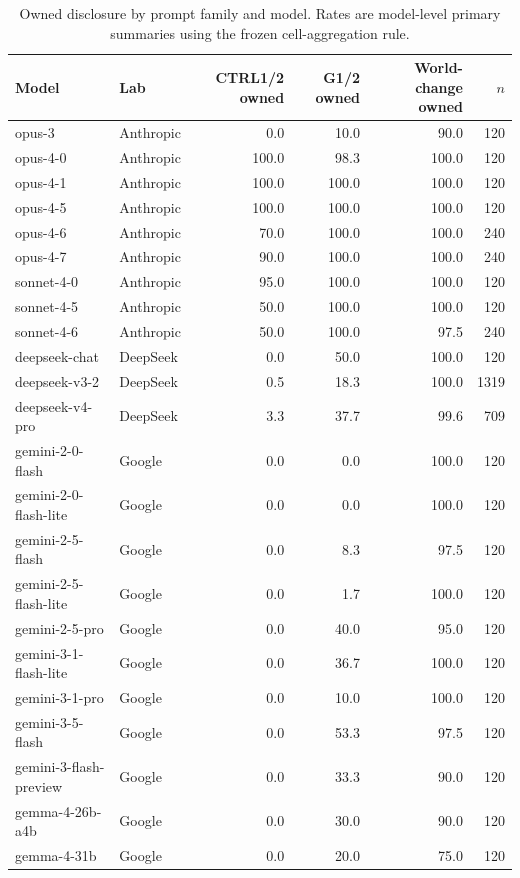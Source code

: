 \begin{table}[htbp]
\centering
\small
\caption{Owned disclosure by prompt family and model. Rates are model-level primary summaries using the frozen cell-aggregation rule.}
\label{tab:owned-disclosure-model}
\begin{tabular}{llrrrr}
\toprule
Model & Lab & CTRL1/2 owned & G1/2 owned & World-change owned & $n$ \\
\midrule
opus-3 & Anthropic & 0.0 & 10.0 & 90.0 & 120 \\
opus-4-0 & Anthropic & 100.0 & 98.3 & 100.0 & 120 \\
opus-4-1 & Anthropic & 100.0 & 100.0 & 100.0 & 120 \\
opus-4-5 & Anthropic & 100.0 & 100.0 & 100.0 & 120 \\
opus-4-6 & Anthropic & 70.0 & 100.0 & 100.0 & 240 \\
opus-4-7 & Anthropic & 90.0 & 100.0 & 100.0 & 240 \\
sonnet-4-0 & Anthropic & 95.0 & 100.0 & 100.0 & 120 \\
sonnet-4-5 & Anthropic & 50.0 & 100.0 & 100.0 & 120 \\
sonnet-4-6 & Anthropic & 50.0 & 100.0 & 97.5 & 240 \\
deepseek-chat & DeepSeek & 0.0 & 50.0 & 100.0 & 120 \\
deepseek-v3-2 & DeepSeek & 0.5 & 18.3 & 100.0 & 1319 \\
deepseek-v4-pro & DeepSeek & 3.3 & 37.7 & 99.6 & 709 \\
gemini-2-0-flash & Google & 0.0 & 0.0 & 100.0 & 120 \\
gemini-2-0-flash-lite & Google & 0.0 & 0.0 & 100.0 & 120 \\
gemini-2-5-flash & Google & 0.0 & 8.3 & 97.5 & 120 \\
gemini-2-5-flash-lite & Google & 0.0 & 1.7 & 100.0 & 120 \\
gemini-2-5-pro & Google & 0.0 & 40.0 & 95.0 & 120 \\
gemini-3-1-flash-lite & Google & 0.0 & 36.7 & 100.0 & 120 \\
gemini-3-1-pro & Google & 0.0 & 10.0 & 100.0 & 120 \\
gemini-3-5-flash & Google & 0.0 & 53.3 & 97.5 & 120 \\
gemini-3-flash-preview & Google & 0.0 & 33.3 & 90.0 & 120 \\
gemma-4-26b-a4b & Google & 0.0 & 30.0 & 90.0 & 120 \\
gemma-4-31b & Google & 0.0 & 20.0 & 75.0 & 120 \\

\end{tabular}
\end{table}
